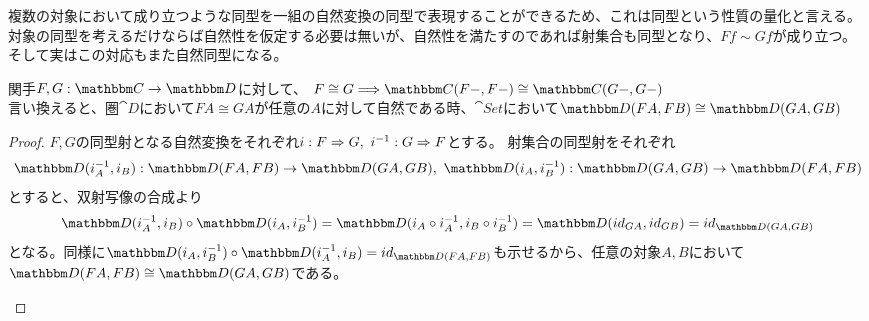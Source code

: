   複数の対象において成り立つような同型を一組の自然変換の同型で表現することができるため、これは同型という性質の量化と言える。
  対象の同型を考えるだけならば自然性を仮定する必要は無いが、自然性を満たすのであれば射集合も同型となり、$Ff\sim Gf$が成り立つ。そして実はこの対応もまた自然同型になる。
  \begin{prop}[自然同型と射集合の対応]
    関手$\functor{F,G}{C}{D}$に対して、
    $F\cong G\Longrightarrow\arset{C}{F-}{F-}\cong\arset{C}{G-}{G-}$\\
    言い換えると、圏$\cat{D}$において$FA\cong GA$が任意の$A$に対して自然である時、$\cat{Set}$において$\arset{D}{FA}{FB}\cong\arset{D}{GA}{GB}$
  \end{prop}
  \begin{proof}
    $F,G$の同型射となる自然変換をそれぞれ$i:F\Rightarrow G,\ i^{-1}:G\Rightarrow F$とする。
    射集合の同型射をそれぞれ\[\mor{\arset{D}{i^{-1}_A}{i_B}}{\arset{D}{FA}{FB}}{\arset{D}{GA}{GB}},\ \mor{\arset{D}{i_A}{i^{-1}_B}}{\arset{D}{GA}{GB}}{\arset{D}{FA}{FB}}\]とすると、双射写像の合成より\[\arset{D}{i^{-1}_A}{i_B}\circ\arset{D}{i_A}{i^{-1}_B}=\arset{D}{i_A\circ i^{-1}_A}{i_B\circ i^{-1}_B}=\arset{D}{id_{GA}}{id_{GB}}=id_{\arset{D}{GA}{GB}}\]となる。同様に$\arset{D}{i_A}{i^{-1}_B}\circ\arset{D}{i^{-1}_A}{i_B}=id_{\arset{D}{FA}{FB}}$も示せるから、任意の対象$A,B$において$\arset{D}{FA}{FB}\cong\arset{D}{GA}{GB}$である。
    \begin{center}
\end{center}
\end{proof}

